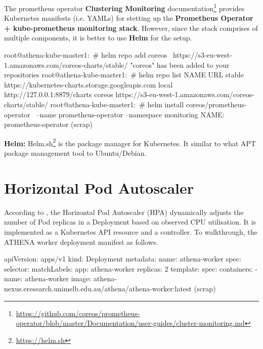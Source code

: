 The prometheus operator \textbf{Clustering Monitoring} documentation\footnote{\url{https://github.com/coreos/prometheus-operator/blob/master/Documentation/user-guides/cluster-monitoring.md}} provides Kubernetes manifests (i.e. YAMLs) for stetting up the \textbf{Prometheus Operator + kube-prometheus monitoring stack}. However, since the stack comprises of multiple components, it is better to use \textbf{Helm} for the setup.  

\begin{small}
\begin{lcverbatim}
root@athena-kube-master1:~# helm repo add coreos \
	 https://s3-eu-west-1.amazonaws.com/coreos-charts/stable/
"coreos" has been added to your repositories
root@athena-kube-master1:~# helm repo list
NAME  	URL
stable	https://kubernetes-charts.storage.googleapis.com
local 	http://127.0.0.1:8879/charts
coreos	https://s3-eu-west-1.amazonaws.com/coreos-charts/stable/
root@athena-kube-master1:~# helm install coreos/prometheus-operator \
	--name prometheus-operator --namespace monitoring
NAME:   prometheus-operator
(scrap)
\end{lcverbatim}
\end{small}

\noindent \textbf{Helm:} \quad Helm.sh\footnote{\url{https://helm.sh}} is the package manager for Kubernetes. It similar to what APT package management tool to Ubuntu/Debian.

\section{Horizontal Pod Autoscaler}

According to \parencite{kubeDoc}, the Horizontal Pod Autoscaler (HPA) dynamically adjusts the number of Pod replicas in a Deployment based on observed CPU utilisation. It is implemented as a Kubernetes API resource and a controller. To walkthrough, the ATHENA worker deployment manifest as follows.

\begin{small}
\begin{lcverbatim}
apiVersion: apps/v1
kind: Deployment
metadata:
  name: athena-worker
spec:
  selector:
    matchLabels:
      app: athena-worker
  replicas: 2
  template:
    spec:
      containers:
      - name: athena-worker
        image: athena-nexus.eresearch.unimelb.edu.au/athena/athena-worker:latest
(scrap)        
\end{lcverbatim}
\end{small}


